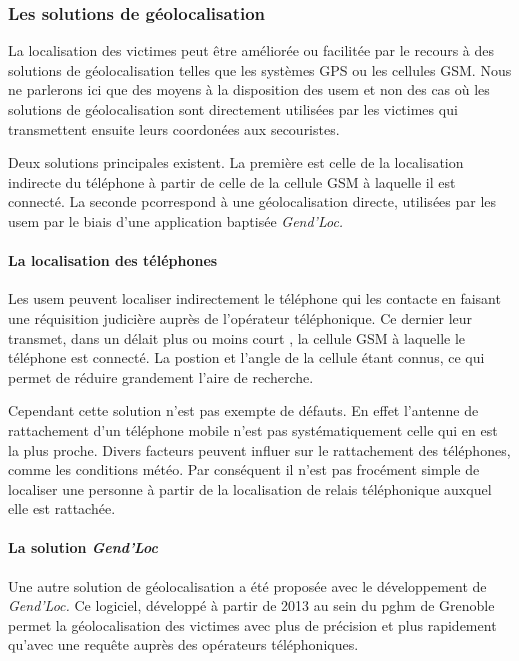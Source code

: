 \subsubsection{Les solutions de géolocalisation}
\label{subsec:1-1-2-2}

La localisation des victimes peut être améliorée ou facilitée par le
recours à des solutions de géolocalisation telles que les systèmes
GPS ou les cellules GSM. Nous ne parlerons ici que des moyens à la
disposition des \ac{usem} et non des cas où les solutions de
géolocalisation sont directement utilisées par les victimes qui
transmettent ensuite leurs coordonées aux secouristes.

Deux solutions principales existent. La première est celle de la
localisation indirecte du téléphone à partir de celle de la cellule
GSM à laquelle il est connecté. La seconde pcorrespond à une
géolocalisation directe, utilisées par les \ac{usem} par le biais
d'une application baptisée \emph{Gend'Loc.}

\paragraph{La localisation des téléphones}


Les \ac{usem} peuvent localiser indirectement le téléphone qui les
contacte en faisant une réquisition judicière auprès de l'opérateur
téléphonique. Ce dernier leur transmet, dans un délait plus ou moins
court , la cellule GSM à laquelle le téléphone est
connecté. La postion et l'angle de la cellule étant connus, ce qui
permet de réduire grandement l'aire de recherche.

Cependant cette solution n'est pas exempte de défauts. En effet
l'antenne de rattachement d'un téléphone mobile n'est pas
systématiquement celle qui en est la plus proche. Divers facteurs
peuvent influer sur le rattachement des téléphones, comme les
conditions météo.
% 
Par conséquent il n'est pas frocément simple de localiser une personne
à partir de la localisation de relais téléphonique auxquel elle est
rattachée. 

\paragraph{La solution \emph{Gend'Loc}}

Une autre solution de géolocalisation a été proposée avec le
développement de \emph{Gend'Loc.} Ce logiciel, développé à partir de
2013 au sein du \ac{pghm} de Grenoble permet la géolocalisation des
victimes avec plus de précision et plus rapidement qu'avec une requête
auprès des opérateurs téléphoniques.

